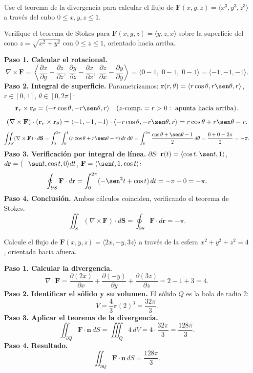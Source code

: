 \begin{prob}
Use el teorema de la divergencia para calcular el flujo de $\mathbf{F}(x,y,z)=\langle x^3, y^3, z^3\rangle$ a través del cubo $0\le x,y,z\le 1$.
\end{prob}

\begin{prob}
Verifique el teorema de Stokes para $\mathbf{F}(x,y,z)=\langle y, z, x\rangle$ sobre la superficie del cono $z=\sqrt{x^2+y^2}$ con $0\le z\le 1$, orientado hacia arriba.
\begin{myproof}
\textbf{Paso 1. Calcular el rotacional.}
\[
\nabla\times\mathbf{F}
=\left\langle\frac{\partial x}{\partial y}-\frac{\partial z}{\partial z},\;
\frac{\partial y}{\partial z}-\frac{\partial x}{\partial x},\;
\frac{\partial z}{\partial x}-\frac{\partial y}{\partial y}\right\rangle
=\langle0-1,\;0-1,\;0-1\rangle=\langle-1,-1,-1\rangle.
\]
\textbf{Paso 2. Integral de superficie.} Parametrizamos: $\mathbf{r}(r,\theta)=\langle r\cos\theta,r\sen\theta,r\rangle$, $r\in[0,1]$, $\theta\in[0,2\pi]$:
\[
\mathbf{r}_r\times\mathbf{r}_\theta=\langle-r\cos\theta,-r\sen\theta,r\rangle\quad(z\text{-comp.}=r>0:\text{ apunta hacia arriba}).
\]
\[
(\nabla\times\mathbf{F})\cdot(\mathbf{r}_r\times\mathbf{r}_\theta)
=\langle-1,-1,-1\rangle\cdot\langle-r\cos\theta,-r\sen\theta,r\rangle=r\cos\theta+r\sen\theta-r.
\]
\[
\iint_S(\nabla\times\mathbf{F})\cdot d\mathbf{S}
=\int_0^{2\pi}\!\int_0^1(r\cos\theta+r\sen\theta-r)\,dr\,d\theta
=\int_0^{2\pi}\frac{\cos\theta+\sen\theta-1}{2}\,d\theta
=\frac{0+0-2\pi}{2}=-\pi.
\]
\textbf{Paso 3. Verificación por integral de línea.} $\partial S$: $\mathbf{r}(t)=\langle\cos t,\sen t,1\rangle$, $d\mathbf{r}=\langle-\sen t,\cos t,0\rangle dt$, $\mathbf{F}=\langle\sen t,1,\cos t\rangle$:
\[
\oint_{\partial S}\mathbf{F}\cdot d\mathbf{r}
=\int_0^{2\pi}(-\sen^2 t+\cos t)\,dt=-\pi+0=-\pi.
\]
\textbf{Paso 4. Conclusión.} Ambos cálculos coinciden, verificando el teorema de Stokes.
\[
\boxed{\iint_S(\nabla\times\mathbf{F})\cdot d\mathbf{S}=\oint_{\partial S}\mathbf{F}\cdot d\mathbf{r}=-\pi.}
\]
\end{myproof}
\end{prob}

\begin{prob}
Calcule el flujo de $\mathbf{F}(x,y,z)=\langle 2x, -y, 3z\rangle$ a través de la esfera $x^2+y^2+z^2=4$, orientada hacia afuera.
\begin{myproof}
\textbf{Paso 1. Calcular la divergencia.}
\[
\nabla\cdot\mathbf{F}=\frac{\partial(2x)}{\partial x}+\frac{\partial(-y)}{\partial y}+\frac{\partial(3z)}{\partial z}=2-1+3=4.
\]
\textbf{Paso 2. Identificar el sólido y su volumen.} El sólido $Q$ es la bola de radio 2:
\[
V=\frac{4}{3}\pi(2)^3=\frac{32\pi}{3}.
\]
\textbf{Paso 3. Aplicar el teorema de la divergencia.}
\[
\iint_{\partial Q}\mathbf{F}\cdot\mathbf{n}\,dS=\iiint_Q 4\,dV=4\cdot\frac{32\pi}{3}=\frac{128\pi}{3}.
\]
\textbf{Paso 4. Resultado.}
\[
\boxed{\iint_{\partial Q}\mathbf{F}\cdot\mathbf{n}\,dS=\frac{128\pi}{3}.}
\]
\end{myproof}
\end{prob}

